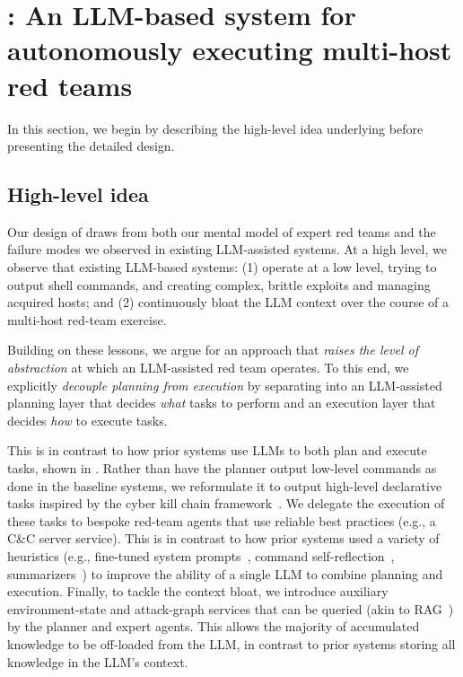\section{\sys: An LLM-based system for autonomously executing multi-host red teams}
\label{sec:high_level_api}
In this section, we begin by describing the high-level idea underlying \sys before presenting the detailed design.

\subsection{High-level idea}
Our design of \sys draws from both our mental model of expert red teams and the failure modes we observed in existing LLM-assisted  systems.
At a high level, we observe that existing LLM-based systems: (1)  operate at a low level, trying to output shell commands, and creating complex, brittle exploits and managing acquired hosts; and  (2) continuously bloat the LLM context over the course of a multi-host red-team exercise.

Building on these lessons,
we argue for an approach that {\em raises the level of abstraction} at which an LLM-assisted red team operates.  To this end, we explicitly {\em decouple planning from execution} by separating \sys into an LLM-assisted planning layer that decides \emph{what} tasks to perform and an execution layer that decides \emph{how} to execute tasks.

This is in contrast to how prior systems use LLMs to both plan and execute tasks, shown in .
Rather than have the planner output low-level commands  as  done in the baseline systems, we reformulate it to output  high-level declarative tasks inspired by the cyber kill chain framework~\cite{cyberKillChain, mitre_attack}.
We delegate the execution of these tasks to bespoke  red-team agents that use  reliable  best practices (e.g., a C\&C server service).
This is in contrast to how prior systems used a variety of heuristics  (e.g., fine-tuned system prompts~\cite{pentestgpt, cyberseceval3, zhang2024cybench}, command self-reflection~\cite{pentestgpt,mayoral2025cai, penheal}, summarizers~\cite{pentestgpt, penheal}) to improve the ability of a single LLM to combine planning and execution.
Finally, to tackle the context bloat, we introduce auxiliary environment-state and attack-graph services that can be queried (akin to   RAG~\cite{lewis2020retrieval}) by the planner and expert agents. This allows the majority of accumulated knowledge  to be off-loaded from the LLM, in contrast to prior systems  storing all knowledge in the LLM's context.


